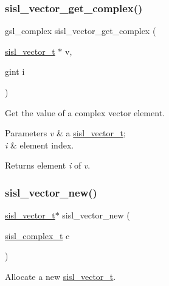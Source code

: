 \subsubsection{\texorpdfstring{sisl\+\_\+vector\+\_\+get\+\_\+complex()}{sisl\_vector\_get\_complex()}}
{\footnotesize\ttfamily gsl\+\_\+complex sisl\+\_\+vector\+\_\+get\+\_\+complex (\begin{DoxyParamCaption}\item[{\mbox{\hyperlink{group__vector_gacbac585492f5005f05f0c0b8463039be}{sisl\+\_\+vector\+\_\+t}} $\ast$}]{v,  }\item[{gint}]{i }\end{DoxyParamCaption})}

Get the value of a complex vector element.


\begin{DoxyParams}{Parameters}
{\em v} & a \mbox{\hyperlink{group__vector_gacbac585492f5005f05f0c0b8463039be}{sisl\+\_\+vector\+\_\+t}}; \\
\hline
{\em i} & element index.\\
\hline
\end{DoxyParams}
\begin{DoxyReturn}{Returns}
element {\itshape i} of {\itshape v}. 
\end{DoxyReturn}
\mbox{\label{group__vector_ga174917724c5ef307cc9d95479e4e9a40}} 
\subsubsection{\texorpdfstring{sisl\+\_\+vector\+\_\+new()}{sisl\_vector\_new()}}
{\footnotesize\ttfamily \mbox{\hyperlink{group__vector_gacbac585492f5005f05f0c0b8463039be}{sisl\+\_\+vector\+\_\+t}}$\ast$ sisl\+\_\+vector\+\_\+new (\begin{DoxyParamCaption}\item[{\mbox{\hyperlink{group__vector_gadbf341f8965fc86dda28912ab5f04930}{sisl\+\_\+complex\+\_\+t}}}]{c }\end{DoxyParamCaption})}

Allocate a new \mbox{\hyperlink{group__vector_gacbac585492f5005f05f0c0b8463039be}{sisl\+\_\+vector\+\_\+t}}.


